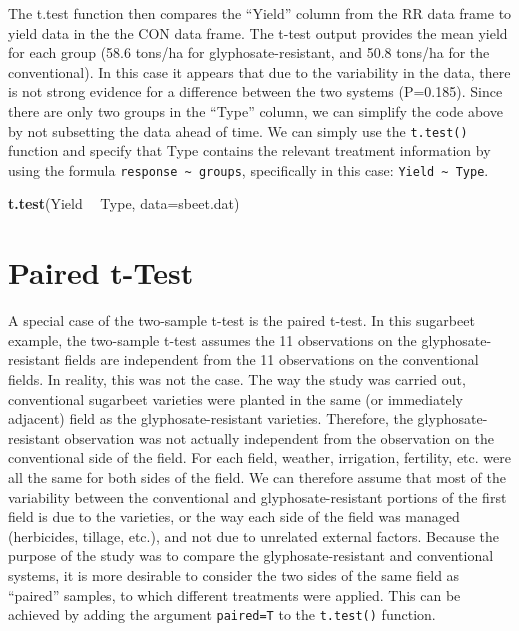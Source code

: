 \documentclass[letterpaper,]{book}
\newenvironment{Shaded}{\begin{snugshade}}{\end{snugshade}}
\newcommand{\DataTypeTok}[1]{\textcolor[rgb]{0.13,0.29,0.53}{#1}}
\newcommand{\KeywordTok}[1]{\textcolor[rgb]{0.13,0.29,0.53}{\textbf{#1}}}
\newcommand{\NormalTok}[1]{#1}
\newcommand{\OperatorTok}[1]{\textcolor[rgb]{0.81,0.36,0.00}{\textbf{#1}}}
\newcommand{\StringTok}[1]{\textcolor[rgb]{0.31,0.60,0.02}{#1}}
\begin{document}
The t.test function then compares the ``Yield'' column from the RR data frame to yield data in the the CON data frame. The t-test output provides the mean yield for each group (58.6 tons/ha for glyphosate-resistant, and 50.8 tons/ha for the conventional). In this case it appears that due to the variability in the data, there is not strong evidence for a difference between the two systems (P=0.185). Since there are only two groups in the ``Type'' column, we can simplify the code above by not subsetting the data ahead of time. We can simply use the \texttt{t.test()} function and specify that Type contains the relevant treatment information by using the formula \texttt{response\ \textasciitilde{}\ groups}, specifically in this case: \texttt{Yield\ \textasciitilde{}\ Type}.

\begin{Shaded}
\begin{Highlighting}[]
\KeywordTok{t.test}\NormalTok{(Yield }\OperatorTok{~}\StringTok{ }\NormalTok{Type, }\DataTypeTok{data=}\NormalTok{sbeet.dat)}
\end{Highlighting}
\end{Shaded}

\hypertarget{paired-t-test}{%
\section{Paired t-Test}\label{paired-t-test}}

A special case of the two-sample t-test is the paired t-test. In this sugarbeet example, the two-sample t-test assumes the 11 observations on the glyphosate-resistant fields are independent from the 11 observations on the conventional fields. In reality, this was not the case. The way the study was carried out, conventional sugarbeet varieties were planted in the same (or immediately adjacent) field as the glyphosate-resistant varieties. Therefore, the glyphosate-resistant observation was not actually independent from the observation on the conventional side of the field. For each field, weather, irrigation, fertility, etc. were all the same for both sides of the field. We can therefore assume that most of the variability between the conventional and glyphosate-resistant portions of the first field is due to the varieties, or the way each side of the field was managed (herbicides, tillage, etc.), and not due to unrelated external factors. Because the purpose of the study was to compare the glyphosate-resistant and conventional systems, it is more desirable to consider the two sides of the same field as ``paired'' samples, to which different treatments were applied. This can be achieved by adding the argument \texttt{paired=T} to the \texttt{t.test()} function.
\end{document}
